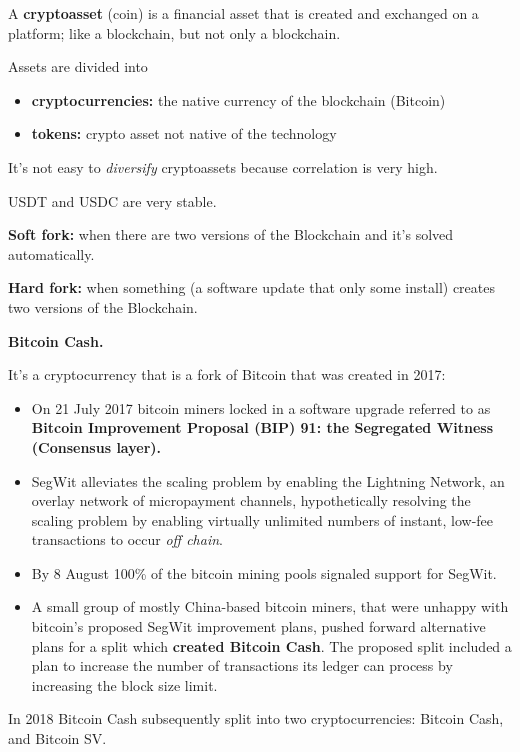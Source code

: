 A \textbf{cryptoasset} (coin) is a financial asset that is created and exchanged on a platform; like a blockchain, but not only a blockchain.

Assets are divided into
\begin{itemize}
	\item \textbf{cryptocurrencies:} the native currency of the blockchain (Bitcoin)
	\item \textbf{tokens:} crypto asset not native of the technology
\end{itemize}

It's not easy to \textit{diversify} cryptoassets because correlation is very high.

USDT and USDC are very stable.

\textbf{Soft fork:} when there are two versions of the Blockchain and it's solved automatically.

\textbf{Hard fork:} when something (a software update that only some install) creates two versions of the Blockchain.

\textbf{Bitcoin Cash.}

It's a cryptocurrency that is a fork of Bitcoin that was created in 2017:
\begin{itemize}
	\item On 21 July 2017 bitcoin miners locked in a software upgrade referred to as \textbf{Bitcoin Improvement Proposal (BIP) 91: the Segregated Witness (Consensus layer).}
	\item SegWit alleviates the scaling problem by enabling the Lightning Network, an overlay network of micropayment channels, hypothetically resolving the scaling problem by enabling virtually unlimited numbers of instant, low-fee transactions to occur \textit{off chain}.
	\item By 8 August 100\% of the bitcoin mining pools signaled support for SegWit.
	\item A small group of mostly China-based bitcoin miners, that were unhappy with bitcoin's proposed SegWit improvement plans, pushed forward alternative plans for a split which \textbf{created Bitcoin Cash}. The proposed split included a plan to increase the number of transactions its ledger can process by increasing the block size limit.
\end{itemize}

In 2018 Bitcoin Cash subsequently split into two cryptocurrencies: Bitcoin Cash, and Bitcoin SV.

